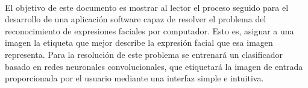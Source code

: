 \chapter*{}






\cleardoublepage
\thispagestyle{empty}

\begin{center}
{\large\bfseries \myTitle}\\
\end{center}
\begin{center}
\myName\\
\end{center}

\\

\vspace{0.7cm}
\\

El objetivo de este documento es mostrar al lector el proceso seguido para el desarrollo de una aplicación software capaz de resolver el problema del reconocimiento de expresiones faciales por computador. Esto es, asignar a una imagen la etiqueta que mejor describe la expresión facial que esa imagen representa. Para la resolución de este problema se entrenará un clasificador basado en redes neuronales convolucionales, que etiquetará la imagen de entrada proporcionada por el usuario mediante una interfaz simple e intuitiva.

\cleardoublepage


\thispagestyle{empty}


\begin{center}
{\large\bfseries \myTitleEN}\\
\end{center}
\begin{center}
\myName\\
\end{center}

\\

\vspace{0.7cm}
\\

